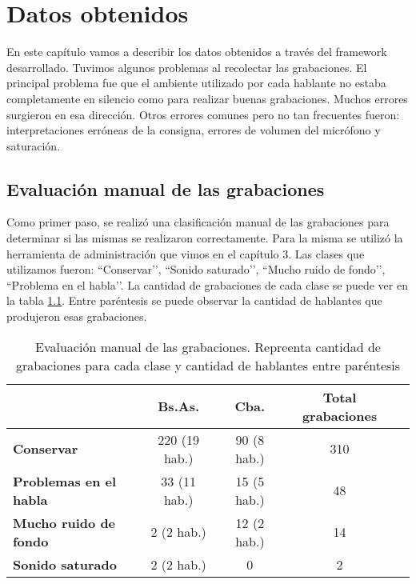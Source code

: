 \chapter{Datos obtenidos}

En este capítulo vamos a describir los datos obtenidos a través del framework desarrollado. Tuvimos algunos problemas al recolectar las grabaciones. El principal problema fue que el ambiente utilizado por cada hablante no estaba completamente en silencio como para realizar buenas grabaciones. Muchos errores surgieron en esa dirección. Otros errores comunes pero no tan frecuentes fueron: interpretaciones erróneas de la consigna, errores de volumen del micrófono y saturación. 

\section{Evaluación manual de las grabaciones}

Como primer paso, se realizó una clasificación manual de las grabaciones para determinar si las mismas se realizaron correctamente. Para la misma se utilizó la herramienta de administración que vimos en el capítulo 3. Las clases que utilizamos fueron: ``Conservar’’, ``Sonido saturado’’, ``Mucho ruido de fondo’’, ``Problema en el habla’’. La cantidad de grabaciones de cada clase se puede ver en la tabla \ref{eva_table}. Entre paréntesis se puede observar la cantidad de hablantes que produjeron esas grabaciones.

\begin{table}[h]
\centering
\begin{tabular}{|l|c|c|c|c|}
\hline
\textbf{}  & \textbf{Bs.As. } & \textbf{Cba.} & \textbf{Total grabaciones} \\ \hline
\textbf{Conservar}  & 220 (19 hab.) & 90 (8 hab.) & 310 \\ \hline
\textbf{Problemas en el habla}  & 33 (11 hab.) & 15 (5 hab.) & 48 \\ \hline
\textbf{Mucho ruido de fondo}  & 2 (2 hab.) & 12 (2 hab.) & 14 \\ \hline
\textbf{Sonido saturado}  & 2 (2 hab.) & 0 & 2 \\ \hline
\end{tabular}
\caption{Evaluación manual de las grabaciones. Repreenta cantidad de grabaciones para cada clase y cantidad de hablantes entre paréntesis}
\label{eva_table}
\end{table}

